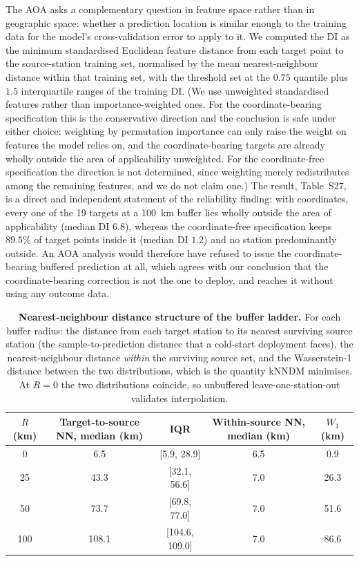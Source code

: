 \documentclass[11pt]{article}
\begin{document}
The AOA asks a complementary question in feature space rather than in geographic space:
whether a prediction location is similar enough to the training data for the model's
cross-validation error to apply to it. We computed the DI as the minimum standardised
Euclidean feature distance from each target point to the source-station training set,
normalised by the mean nearest-neighbour distance within that training set, with the
threshold set at the $0.75$ quantile plus $1.5$ interquartile ranges of the training DI.
(We use unweighted standardised features rather than importance-weighted ones. For the
coordinate-bearing specification this is the conservative direction and the conclusion is
safe under either choice: weighting by permutation importance can only raise the weight on
features the model relies on, and the coordinate-bearing targets are already wholly outside
the area of applicability unweighted. For the coordinate-free specification the direction is
not determined, since weighting merely redistributes among the remaining features, and we do
not claim one.) The result, Table~S27, is a direct and independent statement of
the reliability finding: with coordinates, every one of the 19 targets at a 100~km buffer
lies wholly outside the area of applicability (median DI $6.8$), whereas the
coordinate-free specification keeps $89.5\%$ of target points inside it (median DI $1.2$)
and no station predominantly outside. An AOA analysis would therefore have refused to
issue the coordinate-bearing buffered prediction at all, which agrees with our conclusion
that the coordinate-bearing correction is not the one to deploy, and reaches it without
using any outcome data.

\begin{table}[htbp]\centering\footnotesize
\caption{\textbf{Nearest-neighbour distance structure of the buffer ladder.} For each buffer radius: the distance from each target station to its nearest surviving source station (the sample-to-prediction distance that a cold-start deployment faces), the nearest-neighbour distance \emph{within} the surviving source set, and the Wasserstein-1 distance between the two distributions, which is the quantity kNNDM minimises. At $R=0$ the two distributions coincide, so unbuffered leave-one-station-out validates interpolation.}
\begin{tabular}{ccccc}\toprule
$R$ (km) & Target-to-source NN, median (km) & IQR & Within-source NN, median (km) & $W_1$ (km) \\ \midrule
0 & 6.5 & [5.9, 28.9] & 6.5 & 0.9 \\
25 & 43.3 & [32.1, 56.6] & 7.0 & 26.3 \\
50 & 73.7 & [69.8, 77.0] & 7.0 & 51.6 \\
100 & 108.1 & [104.6, 109.0] & 7.0 & 86.6 \\
\bottomrule\end{tabular}\end{table}
\end{document}
